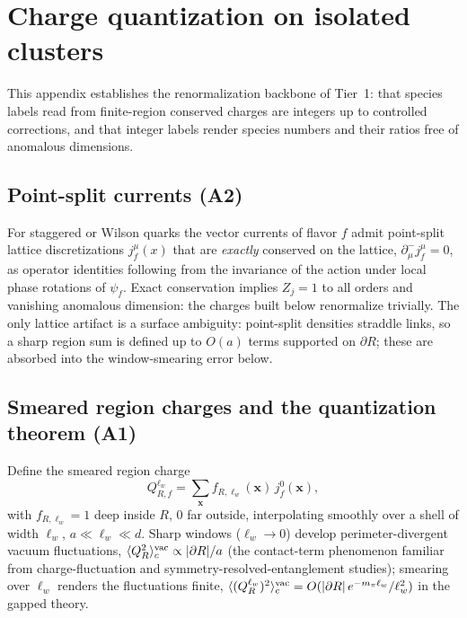 \section{Charge quantization on isolated clusters}
\label{app:charge-quantization}

This appendix establishes the renormalization backbone of Tier~1: that
species labels read from finite-region conserved charges are integers up
to controlled corrections, and that integer labels render species numbers
and their ratios free of anomalous dimensions.

\subsection{Point-split currents (A2)}

For staggered or Wilson quarks the vector currents of flavor $f$ admit
point-split lattice discretizations $j^\mu_f(x)$ that are \emph{exactly}
conserved on the lattice, $\partial^-_\mu j^\mu_f=0$, as operator
identities following from the invariance of the action under local phase
rotations of $\psi_f$.  Exact conservation implies $Z_{j}=1$ to all
orders and vanishing anomalous dimension: the charges built below
renormalize trivially.  The only lattice artifact is a surface ambiguity:
point-split densities straddle links, so a sharp region sum is defined up
to $O(a)$ terms supported on $\partial R$; these are absorbed into the
window-smearing error below.

\subsection{Smeared region charges and the quantization theorem (A1)}

Define the smeared region charge
\begin{equation}
Q^{\ell_w}_{R,f}=\sum_{\mathbf x} f_{R,\ell_w}(\mathbf x)\,
j^0_f(\mathbf x),
\label{eq:qsmear}
\end{equation}
with $f_{R,\ell_w}=1$ deep inside $R$, $0$ far outside, interpolating
smoothly over a shell of width $\ell_w$, $a\ll\ell_w\ll d$.  Sharp
windows ($\ell_w\to0$) develop perimeter-divergent vacuum fluctuations,
$\langle Q_R^2\rangle_c^{\rm vac}\propto|\partial R|/a$ (the
contact-term phenomenon familiar from charge-fluctuation and
symmetry-resolved-entanglement studies); smearing over $\ell_w$ renders
the fluctuations finite, $\langle (Q^{\ell_w}_R)^2\rangle_c^{\rm vac}
= O(|\partial R|\, e^{-m_\pi \ell_w}/\ell_w^2)$ in the gapped theory.

